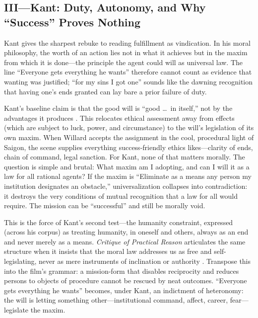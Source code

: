 \subsection*{III—Kant: Duty, Autonomy, and Why ``Success'' Proves Nothing}
\label{ssec:iii-kant}
Kant gives the sharpest rebuke to reading fulfillment as vindication. In his moral philosophy,
the worth of an action lies not in what it achieves but in the maxim from which it is done—the
principle the agent could will as universal law. The line ``Everyone gets everything he wants''
therefore cannot count as evidence that wanting was justified; ``for my sins I got one'' sounds
like the dawning recognition that having one's ends granted can lay bare a prior failure of
duty.

Kant's baseline claim is that the good will is ``good \ldots\ in itself,'' not by the
advantages it produces \parencite[p.~27]{KantCPrR1996}. This relocates ethical assessment away
from effects (which are subject to luck, power, and circumstance) to the will's legislation of
its own maxim. When Willard accepts the assignment in the cool, procedural light of Saigon,
the scene supplies everything success-friendly ethics likes—clarity of ends, chain of command,
legal sanction. For Kant, none of that matters morally. The question is simple and brutal:
What maxim am I adopting, and can I will it as a law for all rational agents? If the maxim is
``Eliminate as a means any person my institution designates an obstacle,'' universalization
collapses into contradiction: it destroys the very conditions of mutual recognition that a law
for all would require. The mission can be ``successful'' and still be morally void.

This is the force of Kant's second test—the humanity constraint, expressed (across his corpus)
as treating humanity, in oneself and others, always as an end and never merely as a means.
\emph{Critique of Practical Reason} articulates the same structure when it insists that the
moral law addresses us as free and self-legislating, never as mere instruments of inclination
or authority \parencite[pp.~30--33]{KantCPrR1996}. Transpose this into the film's grammar:
a mission-form that disables reciprocity and reduces persons to objects of procedure cannot be
rescued by neat outcomes. ``Everyone gets everything he wants'' becomes, under Kant, an
indictment of heteronomy: the will is letting something other—institutional command, affect,
career, fear—legislate the maxim.

